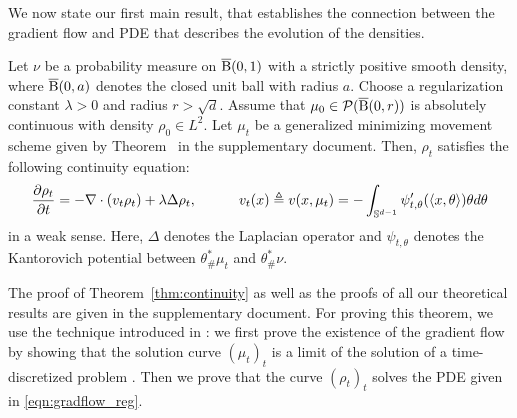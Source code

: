 We now state our first main result, that establishes the connection between the gradient flow and PDE that describes the evolution of the densities. 
\begin{thm}
\label{thm:continuity}
Let $\nu$ be a probability measure on $\operatorname{\overline{B}}(0,1)$ with a strictly positive smooth density, where $\operatorname{\overline{B}}(0,a)$ denotes the closed unit ball with radius $a$. Choose a regularization constant $\lambda > 0$ and radius $r > \sqrt{d}$. Assume that $\mu_0 \in \mathcal{P}(\operatorname{\overline{B}}(0,r))$ is absolutely continuous with density $\rho_0 \in L^2$. Let $\mu_t$ be a generalized minimizing movement scheme given by Theorem~ in the supplementary document. Then, $\rho_t$ satisfies the following continuity equation:
\begin{align}
\frac{\partial \rho_t}{\partial t}   = -\nabla \cdot (v_t \rho_t) + \lambda \Delta \rho_t,  \quad \quad \quad v_t(x) \triangleq v(x,\mu_t) = - \int_{\mathbb{S}^{d-1}} \psi_{t, \theta}'(\langle x , \theta \rangle ) \theta d\theta  \label{eqn:gradflow_reg}
\end{align}
in a weak sense. Here, $\Delta$ denotes the Laplacian operator and $\psi_{t,\theta}$ denotes the Kantorovich potential between $\theta^*_{\#}\mu_t$ and $\theta^*_{\#}\nu$. 
\end{thm}
The proof of Theorem~\ref{thm:continuity} as well as the proofs of all our theoretical results are given in the supplementary document. For proving this theorem, we use the technique introduced in \cite{bonnotte2013unidimensional}: we first prove the existence of the gradient flow by showing that the solution curve $(\mu_t)_t$ is a limit of the solution of a time-discretized problem \cite{jordan1998variational}. Then we prove that the curve $(\rho_t)_t$ solves the PDE given in \eqref{eqn:gradflow_reg}. 





